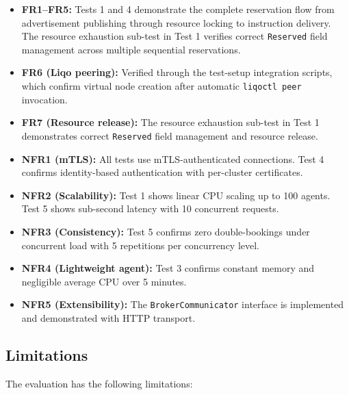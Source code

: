 \begin{itemize}
    \item \textbf{FR1--FR5:} Tests 1 and 4 demonstrate the complete reservation flow from advertisement publishing through resource locking to instruction delivery. The resource exhaustion sub-test in Test 1 verifies correct \texttt{Reserved} field management across multiple sequential reservations.

    \item \textbf{FR6 (Liqo peering):} Verified through the test-setup integration scripts, which confirm virtual node creation after automatic \texttt{liqoctl peer} invocation.

    \item \textbf{FR7 (Resource release):} The resource exhaustion sub-test in Test 1 demonstrates correct \texttt{Reserved} field management and resource release.

    \item \textbf{NFR1 (mTLS):} All tests use mTLS-authenticated connections. Test 4 confirms identity-based authentication with per-cluster certificates.

    \item \textbf{NFR2 (Scalability):} Test 1 shows linear CPU scaling up to 100 agents. Test 5 shows sub-second latency with 10 concurrent requests.

    \item \textbf{NFR3 (Consistency):} Test 5 confirms zero double-bookings under concurrent load with 5 repetitions per concurrency level.

    \item \textbf{NFR4 (Lightweight agent):} Test 3 confirms constant memory and negligible average CPU over 5 minutes.

    \item \textbf{NFR5 (Extensibility):} The \texttt{BrokerCommunicator} interface is implemented and demonstrated with HTTP transport.
\end{itemize}

\subsection{Limitations}

The evaluation has the following limitations:

